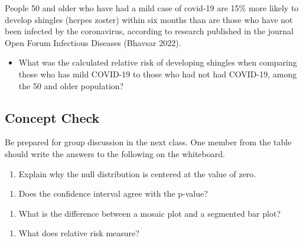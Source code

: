 \documentclass[
]{report}
\providecommand{\tightlist}{%
  \setlength{\itemsep}{0pt}\setlength{\parskip}{0pt}}
\begin{document}
People 50 and older who have had a mild case of covid-19 are 15\% more likely to develop shingles (herpes zoster) within six months than are those who have not been infected by the coronavirus, according to research published in the journal Open Forum Infectious Diseases ({Bhavsar} 2022).

\begin{itemize}
\tightlist
\item
  What was the calculated relative risk of developing shingles when comparing those who has mild COVID-19 to those who had not had COVID-19, among the 50 and older population?
\end{itemize}

\vspace{0.8in}

\subsection{Concept Check}\label{concept-check-6}

Be prepared for group discussion in the next class. One member from the table should write the answers to the following on the whiteboard.

\begin{enumerate}
\def\labelenumi{\arabic{enumi}.}
\tightlist
\item
  Explain why the null distribution is centered at the value of zero.
\end{enumerate}

\vspace{0.5in}

\begin{enumerate}
\def\labelenumi{\arabic{enumi}.}
\setcounter{enumi}{1}
\tightlist
\item
  Does the confidence interval agree with the p-value?
\end{enumerate}

\vspace{0.5in}

\begin{enumerate}
\def\labelenumi{\arabic{enumi}.}
\setcounter{enumi}{2}
\tightlist
\item
  What is the difference between a mosaic plot and a segmented bar plot?
\end{enumerate}

\vspace{0.5in}

\begin{enumerate}
\def\labelenumi{\arabic{enumi}.}
\setcounter{enumi}{3}
\tightlist
\item
  What does relative risk measure?
\end{enumerate}
\end{document}
